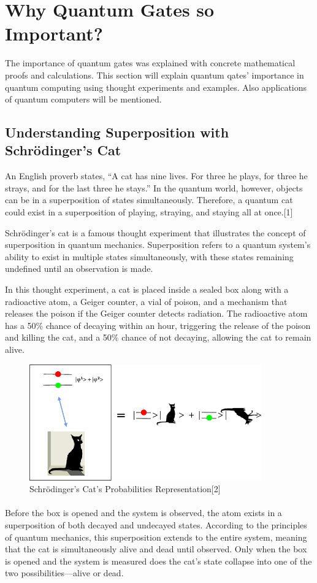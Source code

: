 \documentclass{article}
\begin{document}
\section{Why Quantum Gates so Important?}
The importance of quantum gates was explained with concrete mathematical proofs and calculations. This section will explain quantum qates' importance in quantum computing using thought experiments and examples. Also applications of quantum computers will be mentioned.
\subsection{Understanding Superposition with Schrödinger's Cat}
An English proverb states, “A cat has nine lives. For three he plays, for three he strays, and for the last three he stays.” In the quantum world, however, objects can be in a superposition of states simultaneously. Therefore, a quantum cat could exist in a superposition of playing, straying, and staying all at once.[1]


Schrödinger’s cat is a famous thought experiment that illustrates the concept of superposition in quantum mechanics. Superposition refers to a quantum system's ability to exist in multiple states simultaneously, with these states remaining undefined until an observation is made.

In this thought experiment, a cat is placed inside a sealed box along with a radioactive atom, a Geiger counter, a vial of poison, and a mechanism that releases the poison if the Geiger counter detects radiation. The radioactive atom has a 50\% chance of decaying within an hour, triggering the release of the poison and killing the cat, and a 50\% chance of not decaying, allowing the cat to remain alive.
\begin{figure}[h]
    \centering 
    \includegraphics[width=10cm,height=5cm]{cats.png}
    \caption{Schrödinger's Cat's Probabilities Representation[2]}
    \label{fig:w_logic}
\end{figure}
\paragraph{}Before the box is opened and the system is observed, the atom exists in a superposition of both decayed and undecayed states. According to the principles of quantum mechanics, this superposition extends to the entire system, meaning that the cat is simultaneously alive and dead until observed. Only when the box is opened and the system is measured does the cat’s state collapse into one of the two possibilities—alive or dead.
\end{document}
